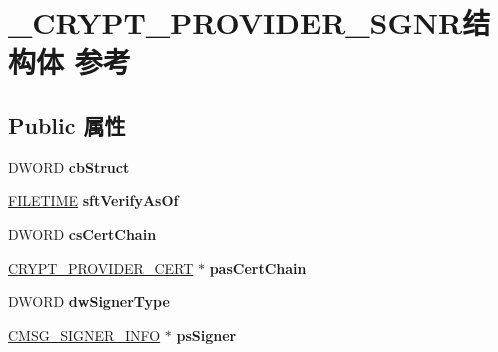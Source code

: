 \hypertarget{struct___c_r_y_p_t___p_r_o_v_i_d_e_r___s_g_n_r}{}\section{\+\_\+\+C\+R\+Y\+P\+T\+\_\+\+P\+R\+O\+V\+I\+D\+E\+R\+\_\+\+S\+G\+N\+R结构体 参考}
\label{struct___c_r_y_p_t___p_r_o_v_i_d_e_r___s_g_n_r}
\subsection*{Public 属性}
\begin{DoxyCompactItemize}
\item 
\mbox{\label{struct___c_r_y_p_t___p_r_o_v_i_d_e_r___s_g_n_r_af810d721d67fd30fe645a6df9e4328e2}} 
D\+W\+O\+RD {\bfseries cb\+Struct}
\item 
\mbox{\label{struct___c_r_y_p_t___p_r_o_v_i_d_e_r___s_g_n_r_af26ee137b49011213c6fe0ed169ecf7d}} 
\hyperlink{struct___f_i_l_e_t_i_m_e}{F\+I\+L\+E\+T\+I\+ME} {\bfseries sft\+Verify\+As\+Of}
\item 
\mbox{\label{struct___c_r_y_p_t___p_r_o_v_i_d_e_r___s_g_n_r_a7bbf61e272d642fecfe441c3b4f95e63}} 
D\+W\+O\+RD {\bfseries cs\+Cert\+Chain}
\item 
\mbox{\label{struct___c_r_y_p_t___p_r_o_v_i_d_e_r___s_g_n_r_aecc7cd26f5ebff77c39c6444285eaf17}} 
\hyperlink{struct___c_r_y_p_t___p_r_o_v_i_d_e_r___c_e_r_t}{C\+R\+Y\+P\+T\+\_\+\+P\+R\+O\+V\+I\+D\+E\+R\+\_\+\+C\+E\+RT} $\ast$ {\bfseries pas\+Cert\+Chain}
\item 
\mbox{\label{struct___c_r_y_p_t___p_r_o_v_i_d_e_r___s_g_n_r_a5ac4c04236bfbe4434ef765811dd998e}} 
D\+W\+O\+RD {\bfseries dw\+Signer\+Type}
\item 
\mbox{\label{struct___c_r_y_p_t___p_r_o_v_i_d_e_r___s_g_n_r_a47e46fb2541161a4564f65c5c1e40c1c}} 
\hyperlink{struct___c_m_s_g___s_i_g_n_e_r___i_n_f_o}{C\+M\+S\+G\+\_\+\+S\+I\+G\+N\+E\+R\+\_\+\+I\+N\+FO} $\ast$ {\bfseries ps\+Signer}

\end{DoxyCompactItemize}
